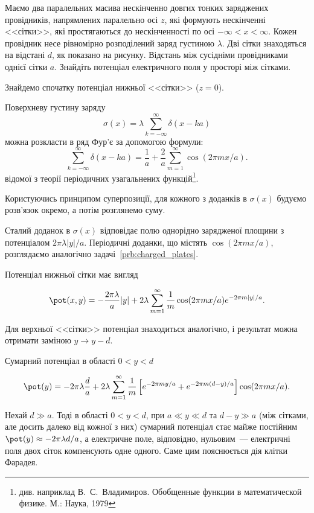 \begin{problem}\label{prb:Faraday_cage}
Маємо два паралельних масива нескінченно довгих тонких заряджених провідників, напрямлених паралельно осі $z$, які формують нескінченні <<сітки>>, які простягаються до нескінченності по осі $-\infty < x < \infty$. Кожен провідник несе рівномірно розподілений заряд густиною $\lambda$. Дві сітки знаходяться на відстані $d$, як показано на рисунку. Відстань між сусідніми провідниками однієї сітки $a$. Знайдіть потенціал електричного поля у просторі між сітками.
\begin{solution}
	Знайдемо спочатку потенціал нижньої <<сітки>> ($z = 0$). 

Поверхневу густину заряду 
\[
    \sigma(x) = \lambda\sum\limits_{k = -\infty}^{\infty} \delta(x - ka)
\]
можна розкласти в ряд Фур'є за допомогою формули:
	\[
		\sum\limits_{k = -\infty}^{\infty} \delta(x - ka) =  \frac{1}{a} + \frac{2}{a}\sum\limits_{m=1}^{\infty}\cos(2\pi mx/a).
	\]
відомої з теорії періодичних узагальнених функцій\footnote{див. наприклад В.~С.~Владимиров. Обобщенные функции в математической физике. М.: Наука, 1979}.

Користуючись принципом суперпозиції, для кожного з доданків в $\sigma(x)$  будуємо розв’язок окремо, а потім розглянемо суму.

Сталий доданок в $\sigma(x)$  відповідає полю однорідно зарядженої площини з потенціалом $2\pi\lambda|y|/a$. Періодичні доданки, що містять $\cos(2\pi mx/a)$, розглядаємо аналогічно задачі~\ref{prb:charged_plates}.

Потенціал нижньої сітки має вигляд


	\[
		\pot(x,y) = -\frac{2\pi\lambda}{a}|y| + 2\lambda\sum\limits_{m = 1}^{\infty} \frac1m \cos(2\pi mx/a)e^{-2\pi m|y|/a}.
	\]

	Для верхньої  <<сітки>> потенціал знаходиться аналогічно, і результат можна отримати заміною $y \to y - d$.

    Сумарний потенціал в області $0 < y <d$


	\[
		\pot(y) = -2\pi\lambda\frac{d}{a} + 2\lambda\sum\limits_{m = 1}^{\infty} \frac1m \left[ e^{-2\pi my/a} +  e^{-2\pi m (d - y)/a} \right] \cos(2\pi mx/a).
	\]

Нехай $d \gg a$. Тоді в області $0<y<d$, при $a \ll y \ll d$ та $d - y \gg a$ (між сітками, але досить далеко від кожної з них) сумарний потенціал стає майже постійним $\pot(y) \approx  - 2\pi \lambda d/a$, а електричне поле, відповідно, нульовим~--- електричні поля двох сіток компенсують одне одного.  Саме цим пояснюється дія клітки Фарадея.

\end{solution}
\end{problem}

